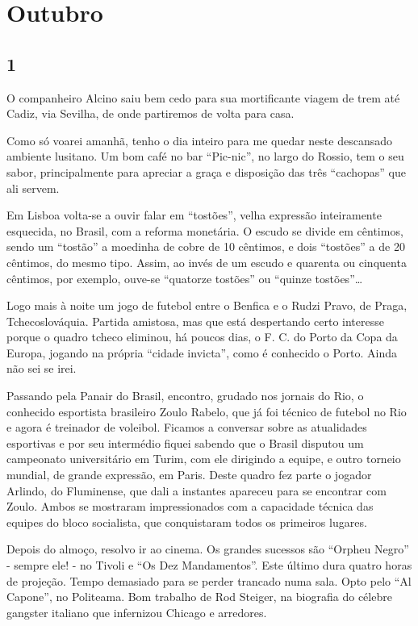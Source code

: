 \chapter{Outubro}
\section*{1 \adfflatleafright {}}
O companheiro Alcino saiu bem cedo para sua mortificante viagem de trem até Cadiz, via Sevilha, de onde partiremos de volta para casa.

Como só voarei amanhã, tenho o dia inteiro para me quedar neste descansado ambiente lusitano. Um bom café no bar “Pic-nic”, no largo do Rossio, tem o seu sabor, principalmente para apreciar a graça e disposição das três “cachopas” que ali servem.

Em Lisboa volta-se a ouvir falar em “tostões”, velha expressão inteiramente esquecida, no Brasil, com a reforma monetária. O escudo se divide em cêntimos, sendo um “tostão” a moedinha de cobre de 10 cêntimos, e dois “tostões” a de 20 cêntimos, do mesmo tipo. Assim, ao invés de um escudo e quarenta ou cinquenta cêntimos, por exemplo, ouve-se “quatorze tostões” ou “quinze tostões”\ldots

Logo mais à noite um jogo de futebol entre o Benfica e o Rudzi Pravo, de Praga, Tchecoslováquia. Partida amistosa, mas que está despertando certo interesse porque o quadro tcheco eliminou, há poucos dias, o F. C. do Porto da Copa da Europa, jogando na própria “cidade invicta”, como é conhecido o Porto. Ainda não sei se irei.

Passando pela Panair do Brasil, encontro, grudado nos jornais do Rio, o conhecido esportista brasileiro Zoulo Rabelo, que já foi técnico de futebol no Rio e agora é treinador de voleibol. Ficamos a conversar sobre as atualidades esportivas e por seu intermédio fiquei sabendo que o Brasil disputou um campeonato universitário em Turim, com ele dirigindo a equipe, e outro torneio mundial, de grande expressão, em Paris. Deste quadro fez parte o jogador Arlindo, do Fluminense, que dali a instantes apareceu para se encontrar com Zoulo. Ambos se mostraram impressionados com a capacidade técnica das equipes do bloco socialista, que conquistaram todos os primeiros lugares.

Depois do almoço, resolvo ir ao cinema. Os grandes sucessos são “Orpheu Negro” - sempre ele! - no Tivoli e “Os Dez Mandamentos”. Este último dura quatro horas de projeção. Tempo demasiado para se perder trancado numa sala. Opto pelo “Al Capone”, no Politeama. Bom trabalho de Rod Steiger, na biografia do célebre gangster italiano que infernizou Chicago e arredores.


